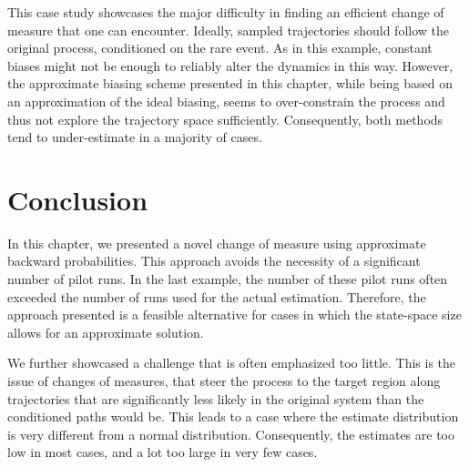 This case study showcases the major difficulty in finding an efficient change of measure that one can encounter.
Ideally, sampled trajectories should follow the original process, conditioned on the rare event.
As in this example, constant biases might not be enough to reliably alter the dynamics in this way.
However, the approximate biasing scheme presented in this chapter, while being based on an approximation of the ideal biasing, seems to over-constrain the process and thus not explore the trajectory space sufficiently.
Consequently, both methods tend to under-estimate in a majority of cases.

\section{Conclusion}
In this chapter, we presented a novel change of measure using approximate backward probabilities.
This approach avoids the necessity of a significant number of pilot runs.
In the last example, the number of these pilot runs often exceeded the number of runs used for the actual estimation.
Therefore, the approach presented is a feasible alternative for cases in which the state-space size allows for an approximate solution.

We further showcased a challenge that is often emphasized too little.
This is the issue of changes of measures, that steer the process to the target region along trajectories that are significantly less likely in the original system than the conditioned paths would be.
This leads to a case where the estimate distribution is very different from a normal distribution.
Consequently, the estimates are too low in most cases, and a lot too large in very few cases.

